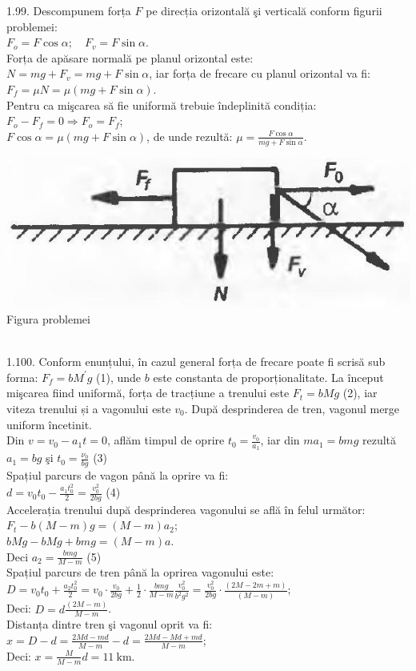 1.99. Descompunem forța $F$ pe direcția orizontală şi verticală conform figurii problemei:\\ $F_{o}=F \cos \alpha; \quad F_{v}=F \sin \alpha$.\\ Forța de apăsare normală pe planul orizontal este:\\ $N=m g+F_{v}=m g+F \sin \alpha$, iar forța de frecare cu planul orizontal va fi:\\ $F_{f}=\mu N=\mu(m g+F \sin \alpha)$.\\ Pentru ca mişcarea să fie uniformă trebuie îndeplinită condiția:\\ $F_{o}-F_{f}=0 \Rightarrow F_{o}=F_{f}$;\\ $F \cos \alpha=\mu(m g+F \sin \alpha)$, de unde rezultă: $\mu=\frac{F \cos \alpha}{m g+F \sin \alpha}$.\\ \begin{center} \includegraphics[width=0.4\linewidth]{images/2025_07_01_5b3ff9fa0d508c8e9f17g-218}\\ Figura problemei \end{center}\\

1.100. Conform enunțului, în cazul general forța de frecare poate fi scrisă sub forma: $F_{f}=b M^{\prime} g$ (1), unde $b$ este constanta de proporționalitate. La început mişcarea fiind uniformă, forța de tracțiune a trenului este $F_{t}=b M g$ (2), iar viteza trenului și a vagonului este $v_{0}$. După desprinderea de tren, vagonul merge uniform încetinit.\\ Din $v=v_{0}-a_{1} t=0$, aflăm timpul de oprire $t_{0}=\frac{v_{0}}{a_{1}}$, iar din $m a_{1}=b m g$ rezultă $a_{1}=b g$ şi $t_{0}=\frac{\nu_{0}}{b g}$ (3)\\ Spațiul parcurs de vagon până la oprire va fi:\\ $d=v_{0} t_{0}-\frac{a_{1} t_{0}^{2}}{2}=\frac{v_{0}^{2}}{2 b g}$ (4)\\ Accelerația trenului după desprinderea vagonului se află în felul următor:\\ $F_{t}-b(M-m) g=(M-m) a_{2}$;\\ $b M g-b M g+b m g=(M-m) a$.\\ Deci $a_{2}=\frac{b m g}{M-m}$ (5)\\ Spațiul parcurs de tren până la oprirea vagonului este:\\ $D=v_{0} t_{0}+\frac{a_{2} t_{0}^{2}}{2}=v_{0} \cdot \frac{v_{0}}{2 b g}+\frac{1}{2} \cdot \frac{b m g}{M-m} \frac{v_{0}^{2}}{b^{2} g^{2}}=\frac{v_{0}^{2}}{2 b g} \cdot \frac{(2 M-2 m+m)}{(M-m)}$;\\ Deci: $D=d \frac{(2 M-m)}{M-m}$.\\ Distanța dintre tren şi vagonul oprit va fi:\\ $x=D-d=\frac{2 M d-m d}{M-m}-d=\frac{2 M d-M d+m d}{M-m}$;\\ Deci: $x=\frac{M}{M-m} d=11 \mathrm{~km}$.\\

